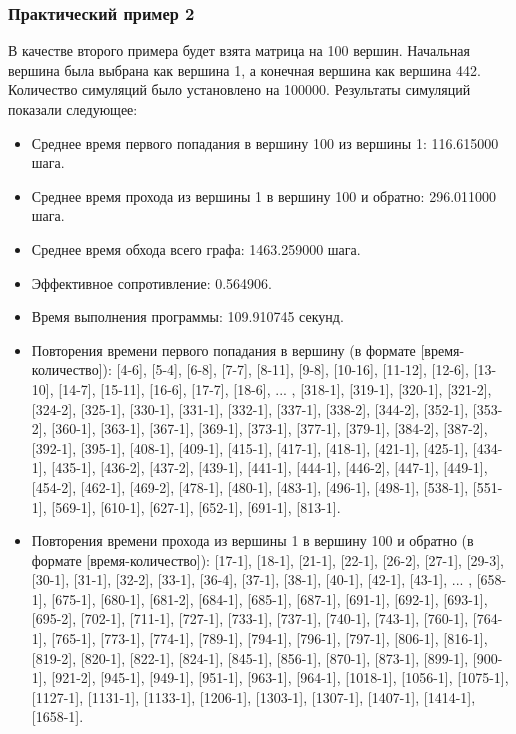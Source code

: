 \documentclass{article}
\begin{document}
\subsubsection{Практический пример 2}
В качестве второго примера будет взята матрица на 100 вершин. Начальная вершина была выбрана как вершина 1, а конечная вершина как вершина 442. Количество симуляций было установлено на 100000. Результаты симуляций показали следующее:
\begin{itemize}
    \item Среднее время первого попадания в вершину 100 из вершины 1: 116.615000 шага.
    \item Среднее время прохода из вершины 1 в вершину 100 и обратно: 296.011000 шага.
    \item Среднее время обхода всего графа: 1463.259000 шага.
    \item Эффективное сопротивление: 0.564906.
    \item Время выполнения программы: 109.910745 секунд.
    \item Повторения времени первого попадания в вершину (в формате [время-количество]):
[4-6], [5-4], [6-8], [7-7], [8-11], [9-8], [10-16], [11-12], [12-6], [13-10], [14-7], [15-11], [16-6], [17-7], [18-6], ... , [318-1], [319-1], [320-1], [321-2], [324-2], [325-1], [330-1], [331-1], [332-1], [337-1], [338-2], [344-2], [352-1], [353-2], [360-1], [363-1], [367-1], [369-1], [373-1], [377-1], [379-1], [384-2], [387-2], [392-1], [395-1], [408-1], [409-1], [415-1], [417-1], [418-1], [421-1], [425-1], [434-1], [435-1], [436-2], [437-2], [439-1], [441-1], [444-1], [446-2], [447-1], [449-1], [454-2], [462-1], [469-2], [478-1], [480-1], [483-1], [496-1], [498-1], [538-1], [551-1], [569-1], [610-1], [627-1], [652-1], [691-1], [813-1].
    \item Повторения времени прохода из вершины 1 в вершину 100 и обратно (в формате [время-количество]):
[17-1], [18-1], [21-1], [22-1], [26-2], [27-1], [29-3], [30-1], [31-1], [32-2], [33-1], [36-4], [37-1], [38-1], [40-1], [42-1], [43-1], ... , [658-1], [675-1], [680-1], [681-2], [684-1], [685-1], [687-1], [691-1], [692-1], [693-1], [695-2], [702-1], [711-1], [727-1], [733-1], [737-1], [740-1], [743-1], [760-1], [764-1], [765-1], [773-1], [774-1], [789-1], [794-1], [796-1], [797-1], [806-1], [816-1], [819-2], [820-1], [822-1], [824-1], [845-1], [856-1], [870-1], [873-1], [899-1], [900-1], [921-2], [945-1], [949-1], [951-1], [963-1], [964-1], [1018-1], [1056-1], [1075-1], [1127-1], [1131-1], [1133-1], [1206-1], [1303-1], [1307-1], [1407-1], [1414-1], [1658-1].

\end{itemize}
\end{document}
